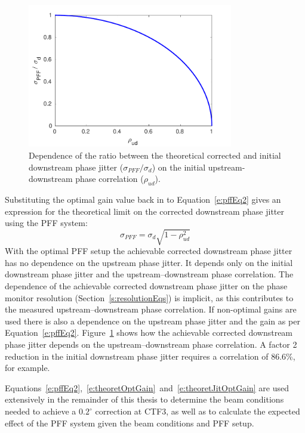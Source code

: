 \begin{figure}
  \centering
  \includegraphics[width=0.8\textwidth]{Figures/propagation/theoretJitvsCorr}
  \caption{Dependence of the ratio between the theoretical corrected and initial downstream phase jitter (\(\sigma_{PFF}/\sigma_d\)) on the initial upstream-downstream phase correlation (\(\rho_{ud}\)).}
  \label{f:theoretJitvsCorr}
\end{figure}

Substituting the optimal gain value back in to Equation~\ref{e:pffEq2} gives an expression for the theoretical limit on the corrected downstream phase jitter using the PFF system:
\begin{equation}
\sigma_{PFF} = \sigma_d\sqrt{1-\rho_{ud}^2}
\label{e:theoretJitOptGain}
\end{equation}
With the optimal PFF setup the achievable corrected downstream phase jitter has no dependence on the upstream phase jitter. It depends only on the initial downstream phase jitter and the upstream--downstream phase correlation. The dependence of the achievable corrected downstream phase jitter on the phase monitor resolution (Section~\ref{s:resolutionEqs}) is implicit, as this contributes to the measured upstream--downstream phase correlation. If non-optimal gains are used there is also a dependence on the upstream phase jitter and the gain as per Equation~\ref{e:pffEq2}. Figure~\ref{f:theoretJitvsCorr} shows how the achievable corrected downstream phase jitter depends on the upstream--downstream phase correlation. A factor 2 reduction in the initial downstream phase jitter requires a correlation of 86.6\%, for example.

Equations~\ref{e:pffEq2},~\ref{e:theoretOptGain}~and~\ref{e:theoretJitOptGain} are used extensively in the remainder of this thesis to determine the beam conditions needed to achieve a \(0.2^\circ\) correction at CTF3, as well as to calculate the expected effect of the PFF system given the beam conditions and PFF setup.

